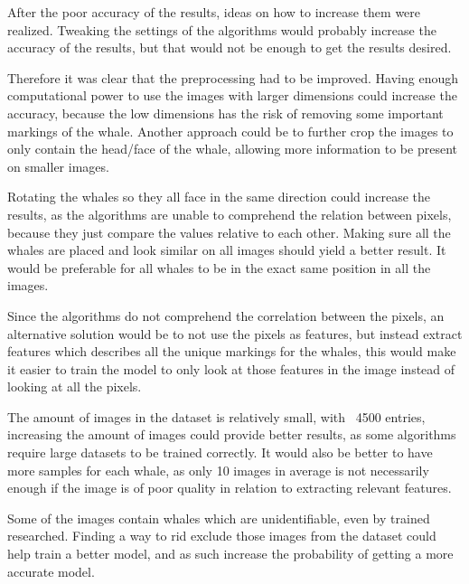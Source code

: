 After the poor accuracy of the results, ideas on how to increase them were realized. Tweaking the settings of the algorithms would probably increase the accuracy of the results, but that would not be enough to get the results desired. 

Therefore it was clear that the preprocessing had to be improved. Having enough computational power to use the images with larger dimensions could increase the accuracy, because the low dimensions has the risk of removing some important markings of the whale. Another approach could be to further crop the images to only contain the head/face of the whale, allowing more information to be present on smaller images.

Rotating the whales so they all face in the same direction could increase the results, as the algorithms are unable to comprehend the relation between pixels, because they just compare the values relative to each other. Making sure all the whales are placed and look similar on all images should yield a better result. It would be preferable for all whales to be in the exact same position in all the images.

Since the algorithms do not comprehend the correlation between the pixels, an alternative solution would be to not use the pixels as features, but instead extract features which describes all the unique markings for the whales, this would make it easier to train the model to only look at those features in the image instead of looking at all the pixels.

The amount of images in the dataset is relatively small, with ~4500 entries, increasing the amount of images could provide better results, as some algorithms require large datasets to be trained correctly. It would also be better to have more samples for each whale, as only 10 images in average is not necessarily enough if the image is of poor quality in relation to extracting relevant features.

Some of the images contain whales which are unidentifiable, even by trained researched. Finding a way to rid exclude those images from the dataset could help train a better model, and as such increase the probability of getting a more accurate model.